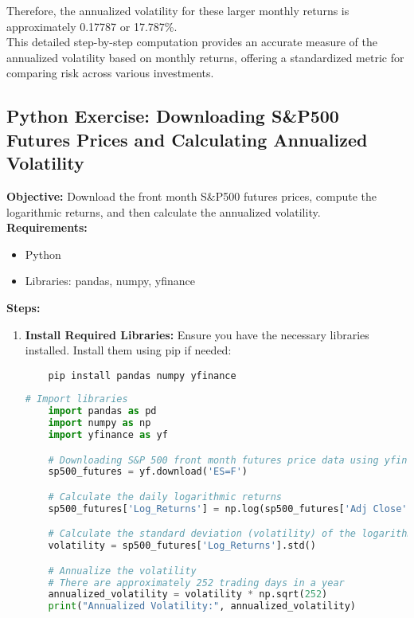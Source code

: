 \documentclass{article}
\begin{document}
Therefore, the annualized volatility for these larger monthly returns is approximately 0.17787 or 17.787\%. \\

This detailed step-by-step computation provides an accurate measure of the annualized volatility based on monthly returns, offering a standardized metric for comparing risk across various investments.

\subsection{Python Exercise: Downloading S\&P500 Futures Prices and Calculating Annualized Volatility}

\textbf{Objective:} Download the front month S\&P500 futures prices, compute the logarithmic returns, and then calculate the annualized volatility. \\

\textbf{Requirements:}
\begin{itemize}
    \item Python
    \item Libraries: pandas, numpy, yfinance
\end{itemize}

\textbf{Steps:}

\begin{enumerate}
    \item \textbf{Install Required Libraries:} Ensure you have the necessary libraries installed. Install them using pip if needed:
    \begin{verbatim}
    pip install pandas numpy yfinance
    \end{verbatim}

    \begin{lstlisting}[language=Python]
    # Import libraries
    import pandas as pd
    import numpy as np
    import yfinance as yf

    # Downloading S&P 500 front month futures price data using yfinance
    sp500_futures = yf.download('ES=F')

    # Calculate the daily logarithmic returns
    sp500_futures['Log_Returns'] = np.log(sp500_futures['Adj Close'] / sp500_futures['Adj Close'].shift(1))

    # Calculate the standard deviation (volatility) of the logarithmic returns
    volatility = sp500_futures['Log_Returns'].std()

    # Annualize the volatility
    # There are approximately 252 trading days in a year
    annualized_volatility = volatility * np.sqrt(252)
    print("Annualized Volatility:", annualized_volatility)
    \end{lstlisting}
\end{enumerate}
\end{document}
